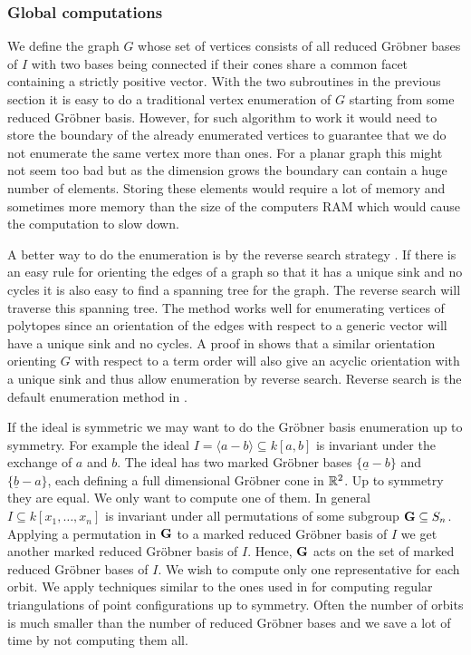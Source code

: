 \subsubsection{Global computations}
\label{subsec:global computations}
We define the graph $G$ whose set of vertices consists of all reduced Gr\"obner bases of $I$ with two bases being connected if their cones share a common facet containing a strictly positive vector. With the two subroutines in the previous section it is easy to do a traditional vertex enumeration of $G$ starting from some reduced Gr\"obner basis. However, for such algorithm to work it would need to store the boundary of the already enumerated vertices to guarantee that we do not enumerate the same vertex more than ones. For a planar graph this might not seem too bad but as the dimension grows the boundary can contain a huge number of elements. Storing these elements would require a lot of memory and sometimes more memory than the size of the computers RAM which would cause the computation to slow down.

A better way to do the enumeration is by the reverse search strategy \cite{avis}. If there is an easy rule for orienting the edges of a graph so that it has a unique sink and no cycles it is also easy to find a spanning tree for the graph. The reverse search will traverse this spanning tree. The method works well for enumerating vertices of polytopes since an orientation of the edges with respect to a generic vector will have a unique sink and no cycles. A proof in \cite{fukuda} shows that a similar orientation orienting $G$ with respect to a term order will also give an acyclic orientation with a unique sink and thus allow enumeration by reverse search. Reverse search is the default enumeration method in \name.

If the ideal is symmetric we may want to do the Gr\"obner basis enumeration up to symmetry. For example the ideal $I=\langle a-b\rangle\subseteq k[a,b]$ is invariant under the exchange of $a$ and $b$. The ideal has two marked Gr\"obner bases $\{\underline{a}-b\}$ and $\{\underline{b}-a\}$, each defining a full dimensional Gr\"obner cone in $\mathbb{R}^2$. Up to symmetry they are equal. We only want to compute one of them. In general $I\subseteq k[x_1,\dots,x_n]$ is invariant under all permutations of some subgroup ${\bf G}\subseteq S_n$. Applying a permutation in ${\bf G}$ to a marked reduced Gr\"obner basis of $I$ we get another marked reduced Gr\"obner basis of $I$. Hence, ${\bf G}$ acts on the set of marked reduced Gr\"obner bases of $I$. We wish to compute only one representative for each orbit. We apply techniques similar to the ones used in \cite{rambau} for computing regular triangulations of point configurations up to symmetry. Often the number of orbits is much smaller than the number of reduced Gr\"obner bases and we save a lot of time by not computing them all.


